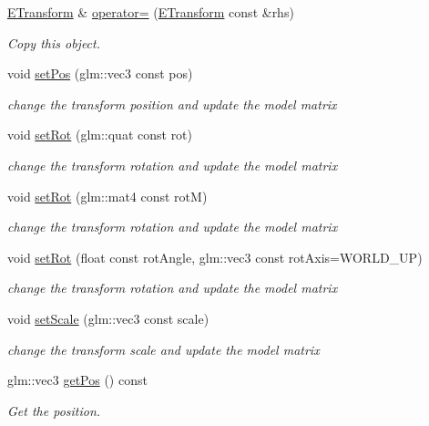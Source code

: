 \begin{DoxyCompactItemize}
\hyperlink{class_e_transform}{E\+Transform} \& \hyperlink{class_e_transform_a5bc967bbd05f50d7f32b8d796d469ee9}{operator=} (\hyperlink{class_e_transform}{E\+Transform} const \&rhs)
\begin{DoxyCompactList}\small\item\em Copy this object. \end{DoxyCompactList}\item 
void \hyperlink{class_e_transform_acfaf5964948ca842e863c0361a171e39}{set\+Pos} (glm\+::vec3 const pos)
\begin{DoxyCompactList}\small\item\em change the transform position and update the model matrix \end{DoxyCompactList}\item 
void \hyperlink{class_e_transform_a68695d3bd428556f04867ffc00cfbe64}{set\+Rot} (glm\+::quat const rot)
\begin{DoxyCompactList}\small\item\em change the transform rotation and update the model matrix \end{DoxyCompactList}\item 
void \hyperlink{class_e_transform_a5d0af609743540c12883bbee0ef8bc79}{set\+Rot} (glm\+::mat4 const rotM)
\begin{DoxyCompactList}\small\item\em change the transform rotation and update the model matrix \end{DoxyCompactList}\item 
void \hyperlink{class_e_transform_a356cecdca7fa9d7f6e06accee8364497}{set\+Rot} (float const rot\+Angle, glm\+::vec3 const rot\+Axis=W\+O\+R\+L\+D\+\_\+\+UP)
\begin{DoxyCompactList}\small\item\em change the transform rotation and update the model matrix \end{DoxyCompactList}\item 
void \hyperlink{class_e_transform_acfb092c44d46a6266345ab27a3b4ff31}{set\+Scale} (glm\+::vec3 const scale)
\begin{DoxyCompactList}\small\item\em change the transform scale and update the model matrix \end{DoxyCompactList}\item 
glm\+::vec3 \hyperlink{class_e_transform_a5583083e2b1ec969ef86b694e740d043}{get\+Pos} () const
\begin{DoxyCompactList}\small\item\em Get the position. \end{DoxyCompactList}\item 

\end{DoxyCompactItemize}
